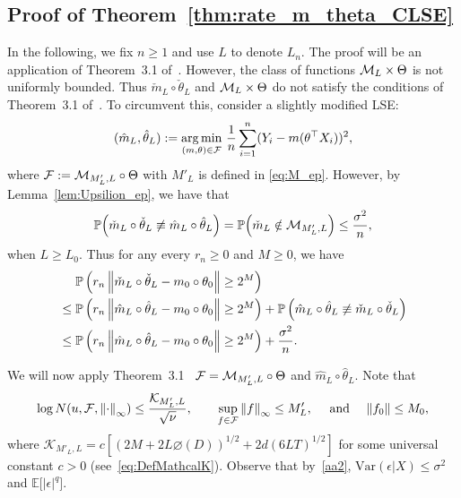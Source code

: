 \subsection{Proof of Theorem~\ref{thm:rate_m_theta_CLSE}}\label{proof:rate_m_theta_CLSE}
In the following, we fix $n\ge 1$ and use $L$ to denote $L_n$. The proof will be an application of Theorem~3.1 of~\cite{KuchiPatra19}. However, the class of functions $\mathcal{M}_L\times\Theta$ is not uniformly bounded. Thus $\check{m}_{L} \circ\check{\theta}_L$ and  $\mathcal{M}_L\times\Theta$ do not satisfy the conditions of Theorem~3.1 of~\cite{KuchiPatra19}. To circumvent this, consider a slightly modified LSE:
\begin{equation}\label{eq:hatm}
(\hat{m}_{L},\hat{\theta}_{L}) := \operatorname*{arg\,min}_{(m,\theta)\in\mathcal{F}}\,\frac{1}{n}\sum_{i=1}^n (Y_i-m(\theta^\top X_i))^2,
\end{equation}
 where $\mathcal{F}:= \mathcal{M}_{M'_{L}, L} \circ \Theta$ with $M'_{L}$ is defined in \eqref{eq:M_ep}. However, by Lemma~\ref{lem:Upsilion_ep}, we have that 
\[
\mathbb{P}\Big(\check{m}_{L} \circ\check{\theta}_L \not\equiv \hat{m}_{L} \circ\hat{\theta}_L \Big) = \mathbb{P}\Big(\check{m}_{L} \notin \mathcal{M}_{M_{L}', L}\Big) \le \frac{\sigma^2}{n},
\]
when $L \ge L_0$. Thus for any every $r_n\ge 0$ and $M\ge 0$, we have
\begin{align}\label{eq:split123}
\begin{split}
&\mathbb{P}\left(r_n\left\lVert\check{m}_{L}\circ\check{\theta}_{L} - m_0\circ\theta_0\right\rVert \ge 2^M\right)\\ 
\le{}& \mathbb{P}\left(r_n\left\lVert\hat{m}_{L}\circ\hat{\theta}_{L} - m_0\circ\theta_0\right\rVert \ge 2^M\right) +  \mathbb{P}\left(\hat{m}_{L}\circ\hat{\theta}_{L} \not\equiv \check{m}_{L}\circ\check{\theta}_{L}\right) \\
{}\le{}& \mathbb{P}\left(r_n\left\lVert\hat{m}_{L}\circ\hat{\theta}_{L} - m_0\circ\theta_0\right\rVert \ge 2^M\right) + \frac{\sigma^2}{n}.
\end{split}
\end{align}

We will now apply Theorem~3.1~\cite{KuchiPatra19} $\mathcal{F} = \mathcal{M}_{M'_{L}, L} \circ \Theta$ and $\hat{m}_{L}\circ\hat{\theta}_{L}$.  Note that
\[
\log N(u, \mathcal{F}, \left\lVert\cdot\right\rVert_{\infty}) \le \frac{\mathcal{K}_{M'_L,L}}{\sqrt{\nu}}, \qquad \sup_{f\in\mathcal{F}}\left\lVert f\right\rVert_{\infty} \le M'_L, \quad \text{ and }\quad  \|f_0\| \le M_0,
\]
where $\mathcal{K}_{M'_L,L}=  c\left[(2M + 2L\diameter(D))^{1/2} + 2d(6LT)^{1/2}\right]$ for some universal constant $c>0$ (see~\eqref{eq:DefMathcalK}). Observe that by~\ref{aa2}, $\mbox{Var}(\epsilon|X) \le \sigma^2$ and $\mathbb{E}\big[|\epsilon|^q\big]$.  

